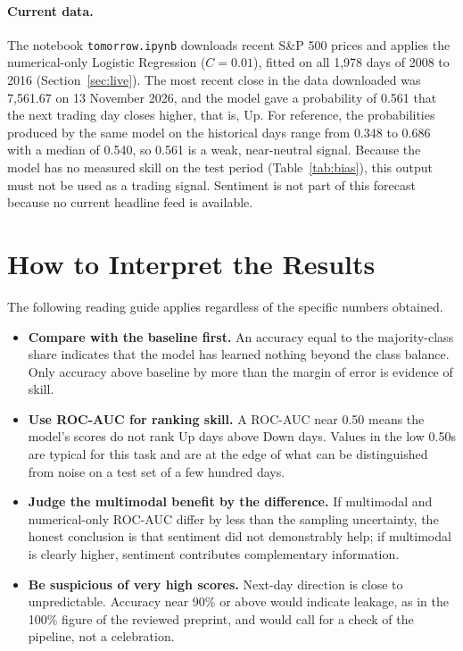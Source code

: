 \paragraph{Current data.} The notebook \texttt{tomorrow.ipynb} downloads recent S\&P 500 prices and applies the numerical-only Logistic Regression ($C=0.01$), fitted on all 1,978 days of 2008 to 2016 (Section~\ref{sec:live}). The most recent close in the data downloaded was 7,561.67 on 13 November 2026, and the model gave a probability of 0.561 that the next trading day closes higher, that is, Up. For reference, the probabilities produced by the same model on the historical days range from 0.348 to 0.686 with a median of 0.540, so 0.561 is a weak, near-neutral signal. Because the model has no measured skill on the test period (Table~\ref{tab:bias}), this output must not be used as a trading signal. Sentiment is not part of this forecast because no current headline feed is available.

\section{How to Interpret the Results}
\label{sec:interpret}
The following reading guide applies regardless of the specific numbers obtained.
\begin{itemize}
  \item \textbf{Compare with the baseline first.} An accuracy equal to the majority-class share indicates that the model has learned nothing beyond the class balance. Only accuracy above baseline by more than the margin of error is evidence of skill.
  \item \textbf{Use ROC-AUC for ranking skill.} A ROC-AUC near 0.50 means the model's scores do not rank Up days above Down days. Values in the low 0.50s are typical for this task and are at the edge of what can be distinguished from noise on a test set of a few hundred days.
  \item \textbf{Judge the multimodal benefit by the difference.} If multimodal and numerical-only ROC-AUC differ by less than the sampling uncertainty, the honest conclusion is that sentiment did not demonstrably help; if multimodal is clearly higher, sentiment contributes complementary information.
  \item \textbf{Be suspicious of very high scores.} Next-day direction is close to unpredictable. Accuracy near 90\% or above would indicate leakage, as in the 100\% figure of the reviewed preprint, and would call for a check of the pipeline, not a celebration.
\end{itemize}

